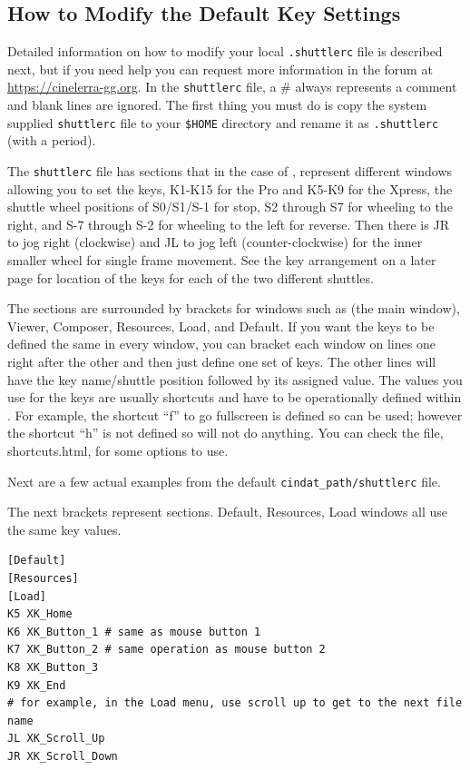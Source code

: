 \subsection{How to Modify the Default Key Settings}%
\label{sub:modify_default_key_settings}

Detailed information on how to modify your local \texttt{.shuttlerc}
file is described next, but if you need help you can request more
information in the forum at {\small
  \url{https://cinelerra-gg.org}}. In the \texttt{shuttlerc} file, a
\# always represents a comment and blank lines are ignored.  The
first thing you must do is copy the system supplied
\texttt{shuttlerc} file to your \texttt{\$HOME} directory and rename
it as \texttt{.shuttlerc} (with a period).

The \texttt{shuttlerc} file has sections that in the case of \CGG{},
represent different windows allowing you to set the keys, K1-K15 for
the Pro and K5-K9 for the Xpress, the shuttle wheel positions of
S0/S1/S-1 for stop, S2 through S7 for wheeling to the right, and S-7
through S-2 for wheeling to the left for reverse.  Then there is JR
to jog right (clockwise) and JL to jog left (counter-clockwise) for
the inner smaller wheel for single frame movement.  See the key
arrangement on a later page for location of the keys for each of the
two different shuttles.

The sections are surrounded by brackets for windows such as \CGG{}
(the main window), Viewer, Composer, Resources, Load, and Default.
If you want the keys to be defined the same in every window, you can
bracket each window on lines one right after the other and then just
define one set of keys.  The other lines will have the key
name/shuttle position followed by its assigned value.  The values
you use for the keys are usually shortcuts and have to be
operationally defined within \CGG{}. For example, the shortcut “f”
to go fullscreen is defined so can be used; however the shortcut “h”
is not defined so will not do anything.  You can check the file,
shortcuts.html, for some options to use.

Next are a few actual examples from the default
\texttt{{cindat\_path}/shuttlerc} file.

The next brackets represent sections. Default, Resources, Load
windows all use the same key values.

\begin{lstlisting}[style=sh]
[Default]
[Resources]
[Load]
K5 XK_Home
K6 XK_Button_1 # same as mouse button 1
K7 XK_Button_2 # same operation as mouse button 2
K8 XK_Button_3
K9 XK_End
# for example, in the Load menu, use scroll up to get to the next file name
JL XK_Scroll_Up
JR XK_Scroll_Down
\end{lstlisting}

